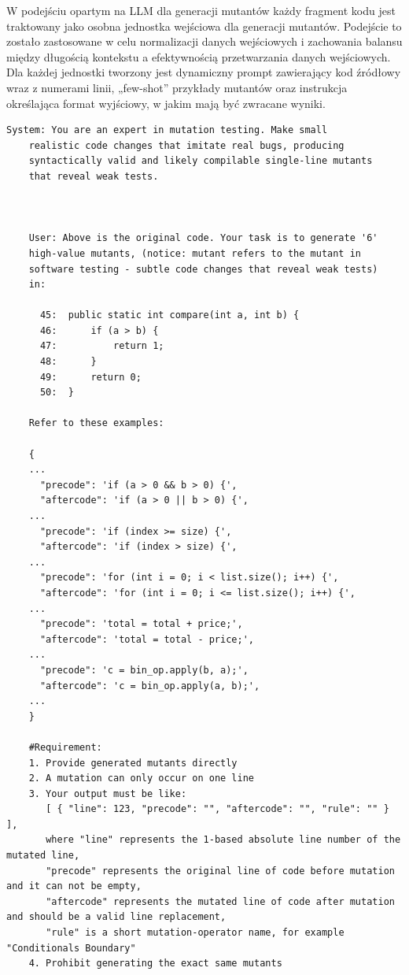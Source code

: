 \documentclass[12pt,a4paper,oldfontcommands]{memoir}
\theoremstyle{plain}
\theoremstyle{definition}
\theoremstyle{remark}
\begin{document}
    W podejściu opartym na LLM dla generacji mutantów każdy fragment kodu jest traktowany jako osobna jednostka wejściowa dla generacji mutantów.
    Podejście to zostało zastosowane w celu normalizacji danych wejściowych i zachowania balansu między długością kontekstu a efektywnością przetwarzania danych wejściowych.
    Dla każdej jednostki tworzony jest dynamiczny prompt zawierający kod źródłowy wraz z numerami linii, „few-shot” przykłady mutantów oraz instrukcja określająca format wyjściowy, w jakim mają być zwracane wyniki.


    \begin{lstlisting}[basicstyle=\small\ttfamily,frame=single,numbers=none]
    System: You are an expert in mutation testing. Make small
    realistic code changes that imitate real bugs, producing
    syntactically valid and likely compilable single-line mutants
    that reveal weak tests.



    User: Above is the original code. Your task is to generate '6'
    high-value mutants, (notice: mutant refers to the mutant in
    software testing - subtle code changes that reveal weak tests)
    in:

      45:  public static int compare(int a, int b) {
      46:      if (a > b) {
      47:          return 1;
      48:      }
      49:      return 0;
      50:  }

    Refer to these examples:

    {
    ...
      "precode": 'if (a > 0 && b > 0) {',
      "aftercode": 'if (a > 0 || b > 0) {',
    ...
      "precode": 'if (index >= size) {',
      "aftercode": 'if (index > size) {',
    ...
      "precode": 'for (int i = 0; i < list.size(); i++) {',
      "aftercode": 'for (int i = 0; i <= list.size(); i++) {',
    ...
      "precode": 'total = total + price;',
      "aftercode": 'total = total - price;',
    ...
      "precode": 'c = bin_op.apply(b, a);',
      "aftercode": 'c = bin_op.apply(a, b);',
    ...
    }

    #Requirement:
    1. Provide generated mutants directly
    2. A mutation can only occur on one line
    3. Your output must be like:
       [ { "line": 123, "precode": "", "aftercode": "", "rule": "" } ],
       where "line" represents the 1-based absolute line number of the mutated line,
       "precode" represents the original line of code before mutation and it can not be empty,
       "aftercode" represents the mutated line of code after mutation and should be a valid line replacement,
       "rule" is a short mutation-operator name, for example "Conditionals Boundary"
    4. Prohibit generating the exact same mutants
    \end{lstlisting}
\end{document}
